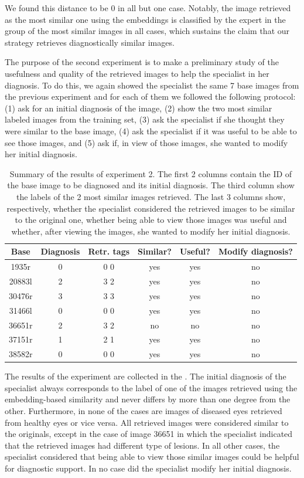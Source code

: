 We found this distance to be \( 0 \) in all but one case. Notably, the image retrieved as the most similar one using the embeddings is classified by the expert in the group of the most similar images in all cases, which sustains the claim that our strategy retrieves diagnostically similar images.

The purpose of the second experiment is to make a preliminary study of the usefulness and quality of the retrieved images to help the specialist in her diagnosis. To do this, we again showed the specialist the same 7 base images from the previous experiment and for each of them we followed the following protocol: (1) ask for an initial diagnosis of the image, (2) show the two most similar labeled images from the training set, (3) ask the specialist if she thought they were similar to the base image, (4) ask the specialist if it was useful to be able to see those images, and (5) ask if, in view of those images, she wanted to modify her initial diagnosis.

\begin{table}[tb]
\centering
\small
\begin{tabular}{|c|c|c|c|c|c|} 
\hline
Base & Diagnosis & Retr. tags & Similar? & Useful? & Modify diagnosis?\\
\hline\hline
1935r  & 0 & 0 0 & yes & yes & no \\	
20883l & 2 & 3 2 & yes &	yes & no \\
30476r & 3 & 3 3 & yes &	yes & no \\
31466l & 0 & 0 0 & yes & yes & no \\
36651r & 2 & 3 2 & no  & no  & no \\	
37151r & 1 & 2 1 & yes & yes & no \\	
38582r & 0 & 0 0 & yes & yes & no \\	
\hline
\end{tabular}
\caption{Summary of the results of experiment 2. The first 2 columns contain the ID of the base image to be diagnosed and its initial diagnosis. The third column show the labels of the 2 most similar images retrieved. The last 3 columns show, respectively, whether the specialist considered the retrieved images to be similar to the original one, whether being able to view those images was useful and whether, after viewing the images, she wanted to modify her initial diagnosis.}
\label{tab:exp2}
\end{table}

The results of the experiment are collected in the . The initial diagnosis of the specialist always corresponds to the label of one of the images retrieved using the embedding-based similarity and never differs by more than one degree from the other. Furthermore, in none of the cases are images of diseased eyes retrieved from healthy eyes or vice versa. All retrieved images were considered similar to the originals, except in the case of image 36651 in which the specialist indicated that the retrieved images had different type of lesions. In all other cases, the specialist considered that being able to view those similar images could be helpful for diagnostic support. In no case did the specialist modify her initial diagnosis.

